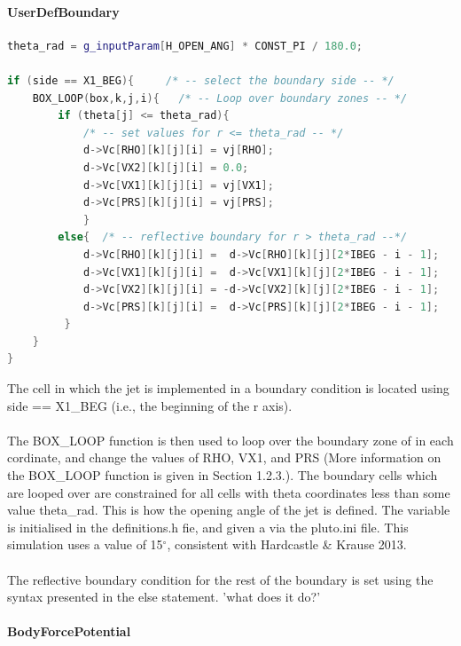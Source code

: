 \documentclass[12pt,a4paper]{report}
\begin{document}
\paragraph{UserDefBoundary}
\begin{lstlisting}[language=C++]
theta_rad = g_inputParam[H_OPEN_ANG] * CONST_PI / 180.0;

if (side == X1_BEG){     /* -- select the boundary side -- */
    BOX_LOOP(box,k,j,i){   /* -- Loop over boundary zones -- */
        if (theta[j] <= theta_rad){     
            /* -- set values for r <= theta_rad -- */
            d->Vc[RHO][k][j][i] = vj[RHO];
            d->Vc[VX2][k][j][i] = 0.0;
            d->Vc[VX1][k][j][i] = vj[VX1];
            d->Vc[PRS][k][j][i] = vj[PRS];
            }
        else{  /* -- reflective boundary for r > theta_rad --*/
            d->Vc[RHO][k][j][i] =  d->Vc[RHO][k][j][2*IBEG - i - 1];
            d->Vc[VX1][k][j][i] =  d->Vc[VX1][k][j][2*IBEG - i - 1];
            d->Vc[VX2][k][j][i] = -d->Vc[VX2][k][j][2*IBEG - i - 1];
            d->Vc[PRS][k][j][i] =  d->Vc[PRS][k][j][2*IBEG - i - 1];
         }
    }
}
\end{lstlisting}
The cell in which the jet is implemented in a boundary condition is located using side == X1\_BEG (i.e., the beginning of the r axis). \\
\\
The BOX\_LOOP function is then used to loop over the boundary zone of in each cordinate, and change the values of RHO, VX1, and PRS (More information on the BOX\_LOOP function is given in Section 1.2.3.). The boundary cells which are looped over are constrained for all cells with theta coordinates less than some value theta\_rad. This is how the opening angle of the jet is defined. The variable is initialised in the definitions.h fie, and given a via the pluto.ini file. This simulation uses a value of 15$^{\circ}$, consistent with Hardcastle \& Krause 2013.\\
\\
The reflective boundary condition for the rest of the boundary is set using the syntax presented in the else statement. 'what does it do?'

\paragraph{BodyForcePotential}
\end{document}
